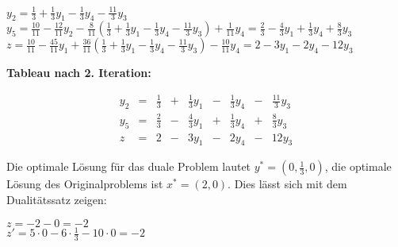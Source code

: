 \documentclass[a4paper,11pt]{article}
\newcommand{\bra}[1]{\left(#1\right)}
\begin{document}
\begin{enumerate}
\begin{enumerate}
        \( y_2 = \frac{1}{3} + \frac{1}{3}y_1 - \frac{1}{3}y_4 - \frac{11}{3}y_3 \)\\
        \( y_5 = \frac{10}{11} - \frac{12}{11}y_2 - \frac{8}{11}\bra{ \frac{1}{3} + \frac{1}{3}y_1 - \frac{1}{3}y_4 - \frac{11}{3}y_3 } + \frac{1}{11}y_4
            = \frac{2}{3} - \frac{4}{3}y_1 + \frac{1}{3}y_4 + \frac{8}{3}y_3 \)\\
        \( z = \frac{10}{11} - \frac{45}{11}y_1 + \frac{36}{11}\bra{ \frac{1}{3} + \frac{1}{3}y_1 - \frac{1}{3}y_4 - \frac{11}{3}y_3 } - \frac{10}{11}y_4
            = 2 - 3y_1 - 2y_4 - 12y_3 \)

        \textbf{Tableau nach 2. Iteration:}

        \[\begin{array}{rcrcrcrcr}
            y_2 & = &  \frac{1}{3} & + & \frac{1}{3}y_1 & - & \frac{1}{3}y_4 & - & \frac{11}{3}y_3 \\
            y_5 & = & \frac{2}{3} & - & \frac{4}{3}y_1 & + &  \frac{1}{3}y_4 & + &  \frac{8}{3}y_3 \\\hline
              z & = & 2 & - & 3y_1 & - & 2y_4 & - & 12y_3
        \end{array}\]

        Die optimale Lösung für das duale Problem lautet \( y^* = (0, \frac{1}{3}, 0) \),
        die optimale Lösung des Originalproblems ist \( x^* = (2, 0) \). Dies lässt
        sich mit dem Dualitätssatz zeigen:

        \( z = - 2 - 0 = -2\)\\
        \( z' = 5 \cdot 0 - 6 \cdot \frac{1}{3} - 10 \cdot 0 = - 2 \)

    \end{enumerate}
\end{enumerate}
\end{document}

